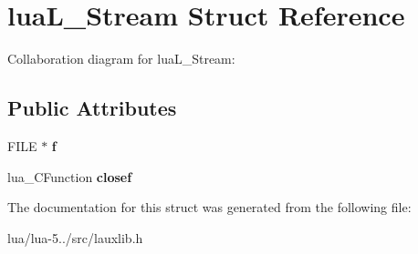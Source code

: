 \hypertarget{structlua_l___stream}{\section{lua\+L\+\_\+\+Stream Struct Reference}
\label{structlua_l___stream}
}


Collaboration diagram for lua\+L\+\_\+\+Stream\+:
\subsection*{Public Attributes}
\begin{DoxyCompactItemize}
\item 
\hypertarget{structlua_l___stream_a50fc81b2c6481ab7768e41bdd3793bab}{F\+I\+L\+E $\ast$ {\bfseries f}}\label{structlua_l___stream_a50fc81b2c6481ab7768e41bdd3793bab}

\item 
\hypertarget{structlua_l___stream_a98731a1b0b1e28336d7206798895e62f}{lua\+\_\+\+C\+Function {\bfseries closef}}\label{structlua_l___stream_a98731a1b0b1e28336d7206798895e62f}

\end{DoxyCompactItemize}


The documentation for this struct was generated from the following file\+:\begin{DoxyCompactItemize}
\item 
lua/lua-\/5../src/lauxlib.\+h\end{DoxyCompactItemize}
